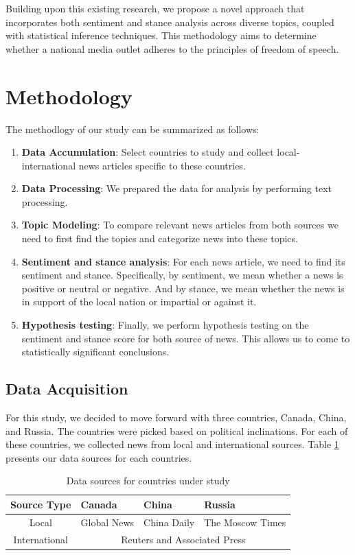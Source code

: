 \documentclass{article}
\theoremstyle{mytheoremstyle}
\theoremstyle{mytheoremstyle}
\theoremstyle{myproblemstyle}
\begin{document}
    Building upon this existing research, we propose a novel approach that incorporates both sentiment and stance analysis across diverse topics, coupled with statistical inference techniques. This methodology aims to determine whether a national media outlet adheres to the principles of freedom of speech.

    \section{Methodology}

    The methodlogy of our study can be summarized as follows:

    \begin{enumerate}
        \item \textbf{Data Accumulation}: Select countries to study and collect local-international news articles specific to these countries.
        \item \textbf{Data Processing}: We prepared the data for analysis by performing text processing.
        \item \textbf{Topic Modeling}: To compare relevant news articles from both sources we need to first find the topics and categorize news into these topics.
        \item \textbf{Sentiment and stance analysis}: For each news article, we need to find its sentiment and stance. Specifically, by sentiment, we mean whether a news is positive or neutral or negative. And by stance, we mean whether the news is in support of the local nation or impartial or against it.
        \item \textbf{Hypothesis testing}: Finally, we perform hypothesis testing on the sentiment and stance score for both source of news. This allows us to come to statistically significant conclusions.
    \end{enumerate}

    \subsection{Data Acquisition}

    For this study, we decided to move forward with three countries, Canada, China, and Russia. The countries were picked based on political inclinations. For each of these countries, we collected news from local and international sources. Table \ref{table:data_sources} presents our data sources for each countries.

    \begin{table}[ph]
        \centering
        \begin{tabular}{|c|l|l|l|}
            \hline
            Source Type & Canada & China & Russia \\
            \hline
            Local & Global News & China Daily & The Moscow Times \\
            \hline
            International & \multicolumn{3}{c|}{Reuters and Associated Press} \\
            \hline
        \end{tabular}
        \caption{Data sources for countries under study}
        \label{table:data_sources}
    \end{table}
\end{document}
